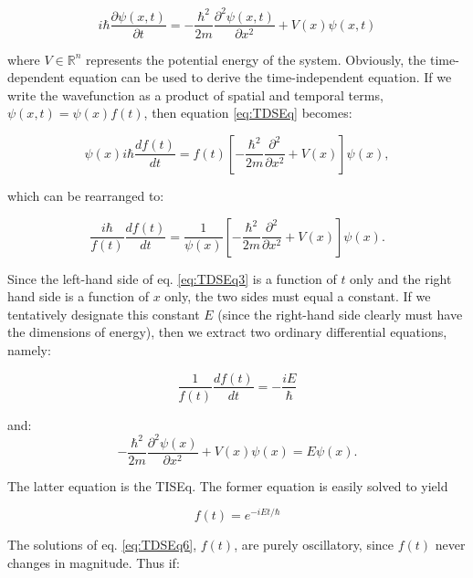 \documentclass[
  9pt,
]{extbook}
\theoremstyle{definition}
\theoremstyle{definition}
\theoremstyle{definition}
\theoremstyle{remark}
\begin{document}
\begin{equation}
i\hbar\frac{\partial \psi(x,t)}{\partial t}=-\frac{\hbar^2}{2m} \frac{\partial^2 \psi(x,t)}{\partial x^2}+V(x)\psi(x,t)
\label{eq:TDSEq}
\end{equation}

where \(V \in \mathbb{R}^{n}\) represents the potential energy of the system.
Obviously, the time-dependent equation can be used to derive the time-independent equation. If we write the wavefunction as a product of spatial and temporal terms, \(\psi(x, t) = \psi(x) f(t)\), then equation \eqref{eq:TDSEq} becomes:

\begin{equation}
\psi(x) i \hbar \frac{df(t)}{dt} = f(t) \left[-\frac{\hbar^2}{2m} \frac{\partial^2}{\partial x^2} + V(x) \right] \psi(x),
\label{eq:TDSEq2}
\end{equation}

which can be rearranged to:

\begin{equation}
\frac{i \hbar}{f(t)} \frac{df(t)}{dt} = \frac{1}{\psi(x)} \left[-\frac{\hbar^2}{2m} \frac{\partial^2}{\partial x^2} + V(x) \right] \psi(x).
\label{eq:TDSEq3}
\end{equation}

Since the left-hand side of eq. \eqref{eq:TDSEq3} is a function of \(t\) only and the right hand side is a function of \(x\) only, the two sides must equal a constant. If we tentatively designate this constant \(E\) (since the right-hand side clearly must have the dimensions of energy), then we extract two ordinary differential equations, namely:

\begin{equation}
\frac{1}{f(t)} \frac{df(t)}{dt} = - \frac{i E}{\hbar}
\label{eq:TDSEq4}
\end{equation}

and:
\begin{equation}
-\frac{\hbar^2}{2m} \frac{\partial^2\psi(x)}{\partial x^2} + V(x) \psi(x) =
E \psi(x).
\label{eq:TDSEq5}
\end{equation}

The latter equation is the TISEq. The former equation is easily solved to yield

\begin{equation}
f(t) = e^{-iEt / \hbar}
\label{eq:TDSEq6}
\end{equation}

The solutions of eq. \eqref{eq:TDSEq6}, \(f(t)\), are purely oscillatory, since \(f(t)\) never changes in magnitude. Thus if:
\end{document}
